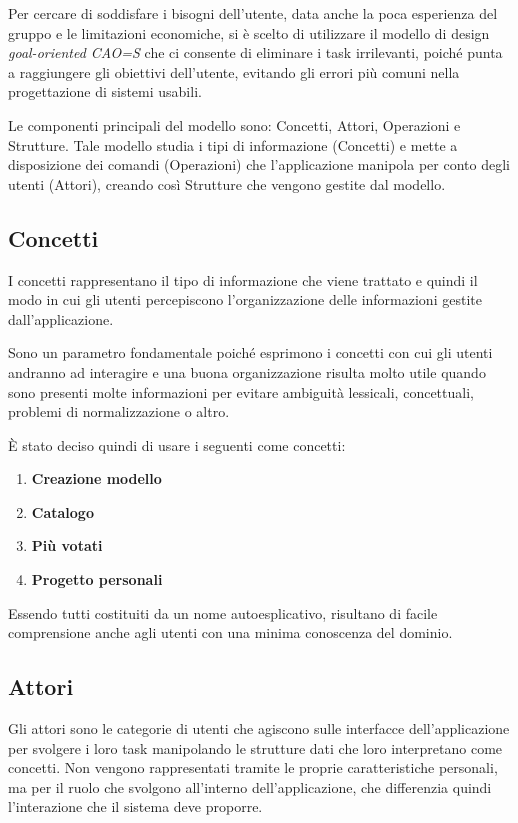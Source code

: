 \documentclass[12pt,italian,]{report}
\providecommand{\tightlist}{%
  \setlength{\itemsep}{0pt}\setlength{\parskip}{0pt}}
\begin{document}
Per cercare di soddisfare i bisogni dell'utente, data anche la poca
esperienza del gruppo e le limitazioni economiche, si è scelto di
utilizzare il modello di design \emph{goal-oriented CAO=S} che ci
consente di eliminare i task irrilevanti, poiché punta a raggiungere gli
obiettivi dell'utente, evitando gli errori più comuni nella
progettazione di sistemi usabili.

Le componenti principali del modello sono: Concetti, Attori,
Operazioni e Strutture. Tale modello studia i tipi di informazione
(Concetti) e mette a disposizione dei comandi (Operazioni) che
l'applicazione manipola per conto degli utenti (Attori), creando così
Strutture che vengono gestite dal modello.

\hypertarget{concetti}{%
\subsection{Concetti}\label{concetti}}

I concetti rappresentano il tipo di informazione che viene trattato e
quindi il modo in cui gli utenti percepiscono l'organizzazione delle
informazioni gestite dall'applicazione.

Sono un parametro fondamentale poiché esprimono i concetti con cui gli
utenti andranno ad interagire e una buona organizzazione risulta molto
utile quando sono presenti molte informazioni per evitare ambiguità
lessicali, concettuali, problemi di normalizzazione o altro.

È stato deciso quindi di usare i seguenti come concetti:

\begin{enumerate}
\def\labelenumi{\arabic{enumi}.}
\tightlist
\item
  \textbf{Creazione modello}
\item
  \textbf{Catalogo}
\item
  \textbf{Più votati}
\item
  \textbf{Progetto personali}
\end{enumerate}

Essendo tutti costituiti da un nome autoesplicativo, risultano di facile comprensione anche agli utenti con una minima conoscenza del dominio.

\hypertarget{attori}{%
\subsection{Attori}\label{attori}}

Gli attori sono le categorie di utenti che agiscono sulle interfacce
dell'applicazione per svolgere i loro task manipolando le strutture dati
che loro interpretano come concetti. Non vengono rappresentati tramite
le proprie caratteristiche personali, ma per il ruolo che svolgono
all'interno dell'applicazione, che differenzia quindi l'interazione che
il sistema deve proporre.
\end{document}
